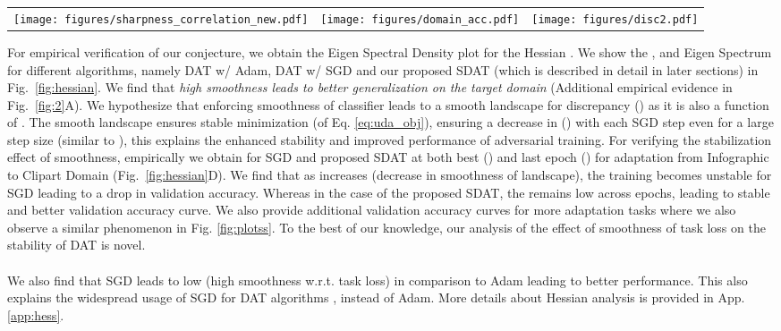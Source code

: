 \documentclass[table,dvipsnames]{article}
\theoremstyle{plain}
\theoremstyle{definition}
\theoremstyle{remark}
\begin{document}
\begin{figure*}[t]
\centering
\begin{tabular}{c c c}
\texttt{[image: figures/sharpness\_correlation\_new.pdf]} &   \texttt{[image: figures/domain\_acc.pdf]} & \texttt{[image: figures/disc2.pdf]} \\
\end{tabular}
\caption{\textbf{A)} Error on Target Domain (y-axis) for Office-Home dataset against maximum eigenvalue  of classification loss in DAT. 
When compared to SGD, Adam converges to a non-smooth minima (high ), leading to a high error on target. 
Using Adam in comparison to SGD, converges to a non-smooth minima (high ) leading to high error on target.
\textbf{B)} Domain Accuracy (vs iterations), it is lower when adversarial loss is smooth (i.e. SDAT w/ adv), which indicates suboptimal discrepancy estimation  \textbf{C)} Target Accuracy on Art  Clipart vs smoothness of the adversarial component. As the smoothness increases (), the target accuracy decreases indicating that smoothing adversarial loss leads to sub-optimal generalization.}
\label{fig:2}
\end{figure*}

For empirical verification of our conjecture, we obtain the Eigen Spectral Density plot for the Hessian . We show the ,  and Eigen Spectrum for different algorithms, namely DAT w/ Adam, DAT w/ SGD and our proposed SDAT (which is described in detail in later sections) in Fig.\ \ref{fig:hessian}. We find that \textit{high smoothness leads to better generalization on the target domain} (Additional empirical evidence in Fig.\ \ref{fig:2}A). We hypothesize that enforcing smoothness of classifier  leads to a smooth landscape for discrepancy ()  as it is also a function of . The smooth landscape ensures stable minimization (of Eq. \ref{eq:uda_obj}), ensuring a decrease in ()  with each SGD step even for a large step size (similar to \citep{chu2020smoothness}), this explains the enhanced stability and improved performance of adversarial training. For verifying the stabilization effect of smoothness, empirically we obtain  for SGD and proposed SDAT at both best () and last epoch () for adaptation from Infographic to Clipart Domain (Fig.\ \ref{fig:hessian}\textcolor{mydarkblue}{D}). We find that as  increases (decrease in smoothness of landscape), the training becomes unstable for SGD leading to a drop in validation accuracy. Whereas in the case of the proposed SDAT, the  remains low across epochs, leading to stable and better validation accuracy curve. We also provide additional validation accuracy curves for more adaptation tasks where we also observe a similar phenomenon in Fig. \ref{fig:plotss}. To the best of our knowledge, our analysis of the effect of smoothness of task loss on the stability of DAT is novel. \\
\\
We also find that SGD leads to low  (high smoothness w.r.t. task loss) in comparison to Adam leading to better performance. This also explains the widespread usage of SGD for DAT algorithms \citep{ganin2015unsupervised, long2018conditional, saito2018adversarial}, instead of Adam. More details about Hessian analysis is provided in App. \ref{app:hess}.
\end{document}
